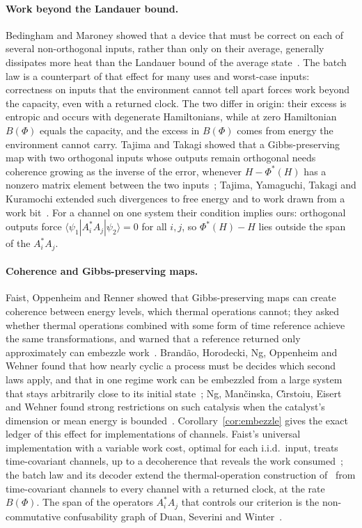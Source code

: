 \documentclass[11pt]{article}
\theoremstyle{definition}
\theoremstyle{remark}
\begin{document}
\paragraph{Work beyond the Landauer bound.} Bedingham and Maroney showed that a device that must be correct on each of several non-orthogonal inputs, rather than only on their average, generally dissipates more heat than the Landauer bound of the average state~\cite{BedinghamMaroney}. The batch law is a counterpart of that effect for many uses and worst-case inputs: correctness on inputs that the environment cannot tell apart forces work beyond the capacity, even with a returned clock. The two differ in origin: their excess is entropic and occurs with degenerate Hamiltonians, while at zero Hamiltonian $B(\Phi)$ equals the capacity, and the excess in $B(\Phi)$ comes from energy the environment cannot carry. Tajima and Takagi showed that a Gibbs-preserving map with two orthogonal inputs whose outputs remain orthogonal needs coherence growing as the inverse of the error, whenever $H-\Phi^*(H)$ has a nonzero matrix element between the two inputs~\cite{TajimaTakagi25}; Tajima, Yamaguchi, Takagi and Kuramochi extended such divergences to free energy and to work drawn from a work bit~\cite{TYTK25}. For a channel on one system their condition implies ours: orthogonal outputs force $\langle\psi_1|A_i^*A_j|\psi_2\rangle=0$ for all $i,j$, so $\Phi^*(H)-H$ lies outside the span of the $A_i^*A_j$.

\paragraph{Coherence and Gibbs-preserving maps.} Faist, Oppenheim and Renner showed that Gibbs-preserving maps can create coherence between energy levels, which thermal operations cannot; they asked whether thermal operations combined with some form of time reference achieve the same transformations, and warned that a reference returned only approximately can embezzle work~\cite{FOR15}. Brand\~ao, Horodecki, Ng, Oppenheim and Wehner found that how nearly cyclic a process must be decides which second laws apply, and that in one regime work can be embezzled from a large system that stays arbitrarily close to its initial state~\cite{BrandaoSecondLaws15}; Ng, Man\v{c}inska, C\^{\i}rstoiu, Eisert and Wehner found strong restrictions on such catalysis when the catalyst's dimension or mean energy is bounded~\cite{NgCatalysis15}. Corollary~\ref{cor:embezzle} gives the exact ledger of this effect for implementations of channels. Faist's universal implementation with a variable work cost, optimal for each i.i.d.\ input, treats time-covariant channels, up to a decoherence that reveals the work consumed~\cite{Faist26}; the batch law and its decoder extend the thermal-operation construction of~\cite[Sec.~7]{FBB21} from time-covariant channels to every channel with a returned clock, at the rate $B(\Phi)$. The span of the operators $A_i^*A_j$ that controls our criterion is the non-commutative confusability graph of Duan, Severini and Winter~\cite{DSW13}.
\end{document}
